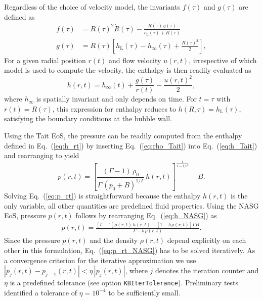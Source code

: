 Regardless of the choice of velocity model, the invariants $f(\tau)$ and $g(\tau)$ are defined as
\begin{align}
    f(\tau) &= R(\tau)^2 \dot{R}(\tau) - \frac{R(\tau) \, g(\tau)}{c_\mathrm{L}(\tau) + \dot{R}(\tau)}   \label{eq:f_R} \\  
    g(\tau) &= R(\tau) \left[h_\mathrm{L}(\tau) - h_\infty(\tau) + \frac{\dot{R}(\tau)^2}{2} \right]
    \label{eq:g_R} ,
\end{align}
For a given radial position $r(t)$ and flow velocity $u(r,t)$, irrespective of which model is used to compute the velocity, the enthalpy is then readily evaluated as
\begin{equation}
    h(r,t) = h_\infty(t) + \frac{g(\tau)}{r(t)} - \frac{u(r,t)^2}{2}, \label{eq:h_rt}
\end{equation}
where $h_\infty$ is spatially invariant and only depends on time.
For $t=\tau$ with $r(t)=R(\tau)$, this expression for enthalpy reduces to $h(R,\tau)=h_\mathrm{L}(\tau)$, satisfying the boundary conditions at the bubble wall. 

Using the Tait EoS, the pressure can be readily computed from the enthalpy defined in Eq.~(\ref{eq:h_rt}) by inserting Eq.~(\ref{eq:rho_Tait}) into Eq.~(\ref{eq:h_Tait}) and rearranging to yield
\begin{equation}
    p(r,t) = \left[ \frac{(\Gamma-1) \, \rho_0}{\Gamma \, (p_0+B)^{1/\Gamma}} \, h(r,t) \right]^{\frac{1}{1-1/\Gamma}} - B. \label{eq:p_rt}
\end{equation}
Solving Eq.~(\ref{eq:p_rt}) is straightforward because the enthalpy $h(r,t)$ is the only variable, all other quantities are predefined fluid properties. Using the NASG EoS, pressure $p(r,t)$ follows by rearranging Eq.~(\ref{eq:h_NASG}) as
\begin{eqnarray}
p(r,t) = \frac{\left[\Gamma-1\right] \rho(r,t) \, h(r,t) - \left[1 - b \, \rho(r,t) \right] \Gamma B}{\Gamma - b \, \rho(r,t)}.  \label{eq:p_rt_NASG}
\end{eqnarray}
Since the pressure $p(r,t)$ and the density $\rho(r,t)$ depend explicitly on each other in this formulation, Eq.~(\ref{eq:p_rt_NASG}) has to be solved iteratively. As a convergence criterion for the iterative approximation we use $|p_j(r,t) - p_{j-1}(r,t)| < \eta \, |p_j(r,t)|$, where $j$ denotes the iteration counter and $\eta$ is a predefined tolerance (see option {\tt KBIterTolerance}). Preliminary tests identified a tolerance of $\eta = 10^{-4}$ to be sufficiently small.


